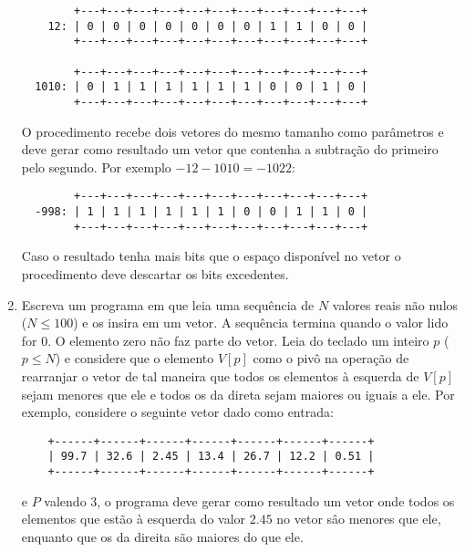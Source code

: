 \begin{enumerate}
\begin{center}
\begin{small}
\begin{verbatim}
        +---+---+---+---+---+---+---+---+---+---+---+
    12: | 0 | 0 | 0 | 0 | 0 | 0 | 0 | 1 | 1 | 0 | 0 |
        +---+---+---+---+---+---+---+---+---+---+---+

        +---+---+---+---+---+---+---+---+---+---+---+
  1010: | 0 | 1 | 1 | 1 | 1 | 1 | 1 | 0 | 0 | 1 | 0 |
        +---+---+---+---+---+---+---+---+---+---+---+
\end{verbatim}
\end{small}
\end{center}
O procedimento recebe dois vetores do mesmo tamanho como parâmetros e 
deve gerar como resultado um vetor que contenha a subtração do 
primeiro pelo segundo. Por exemplo $-12 - 1010 = -1022$:
\begin{center}
\begin{small}
\begin{verbatim}
        +---+---+---+---+---+---+---+---+---+---+---+ 
  -998: | 1 | 1 | 1 | 1 | 1 | 1 | 0 | 0 | 1 | 1 | 0 |
        +---+---+---+---+---+---+---+---+---+---+---+ 
\end{verbatim}
\end{small}
\end{center}
Caso o resultado tenha mais bits que o espaço disponível no vetor
o procedimento deve descartar os bits excedentes. 

\item Escreva um programa em  
que leia uma sequência de $N$ valores
reais não nulos ($N \leq 100$) e os insira em um vetor.
A sequência termina quando o valor lido for 0. O elemento zero não faz
parte do vetor. Leia do teclado um inteiro $p$ ($p \leq N$) e
considere que o elemento $V[p]$ como o pivô na operação
de rearranjar o vetor de tal maneira que todos os elementos à
esquerda de $V[p]$ sejam menores que ele e todos os da direta sejam
maiores ou iguais a ele. Por exemplo, considere o seguinte vetor dado
como entrada: 
\begin{center}
\begin{small}
\begin{verbatim}
    +------+------+------+------+------+------+------+
    | 99.7 | 32.6 | 2.45 | 13.4 | 26.7 | 12.2 | 0.51 | 
    +------+------+------+------+------+------+------+
\end{verbatim}
\end{small}
\end{center}
e $P$ valendo 3, o programa deve gerar como resultado um vetor onde
todos os elementos que estão à esquerda do valor $2.45$ no vetor sâo menores
que ele, enquanto que os da direita são maiores do que ele.


\end{enumerate}
